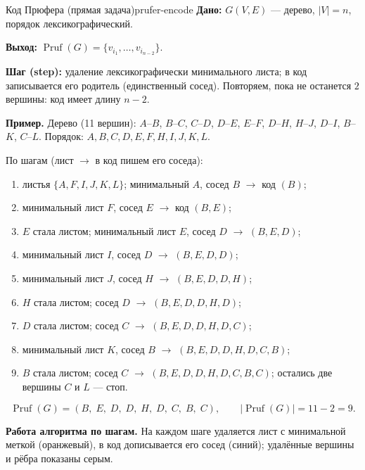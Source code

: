\begin{algo}{Код Прюфера (прямая задача)}{prufer-encode}
\textbf{Дано:} $G(V, E)$ --- дерево, $|V| = n$, порядок лексикографический.

\textbf{Выход:} $\operatorname{Pruf}(G) = \{v_{i_1}, \ldots, v_{i_{n-2}}\}$.

\textbf{Шаг (step):} удаление лексикографически минимального листа;
в код записывается его родитель (единственный сосед). Повторяем,
пока не останется $2$ вершины: код имеет длину $n - 2$.


\medskip
\noindent\textbf{Пример.}
Дерево (11 вершин): $A$--$B$, $B$--$C$, $C$--$D$, $D$--$E$, $E$--$F$,
$D$--$H$, $H$--$J$, $D$--$I$, $B$--$K$, $C$--$L$.
Порядок: $A, B, C, D, E, F, H, I, J, K, L$.

\medskip
По шагам (лист $\to$ в код пишем его соседа):
\begin{enumerate}
  \item листья $\{A, F, I, J, K, L\}$; минимальный $A$, сосед $B$ $\to$ код $(B)$;
  \item минимальный лист $F$, сосед $E$ $\to$ код $(B, E)$;
  \item $E$ стала листом; минимальный лист $E$, сосед $D$ $\to$ $(B, E, D)$;
  \item минимальный лист $I$, сосед $D$ $\to$ $(B, E, D, D)$;
  \item минимальный лист $J$, сосед $H$ $\to$ $(B, E, D, D, H)$;
  \item $H$ стала листом; сосед $D$ $\to$ $(B, E, D, D, H, D)$;
  \item $D$ стала листом; сосед $C$ $\to$ $(B, E, D, D, H, D, C)$;
  \item минимальный лист $K$, сосед $B$ $\to$ $(B, E, D, D, H, D, C, B)$;
  \item $B$ стала листом; сосед $C$ $\to$ $(B, E, D, D, H, D, C, B, C)$;
        остались две вершины $C$ и $L$ --- стоп.
\end{enumerate}

\[
  \operatorname{Pruf}(G) = (B,\; E,\; D,\; D,\; H,\; D,\; C,\; B,\; C),
  \qquad |\operatorname{Pruf}(G)| = 11 - 2 = 9.
\]

\medskip
\noindent\textbf{Работа алгоритма по шагам.} На каждом шаге удаляется
лист с минимальной меткой (оранжевый), в код дописывается его сосед
(синий); удалённые вершины и рёбра показаны серым.


\end{algo}

